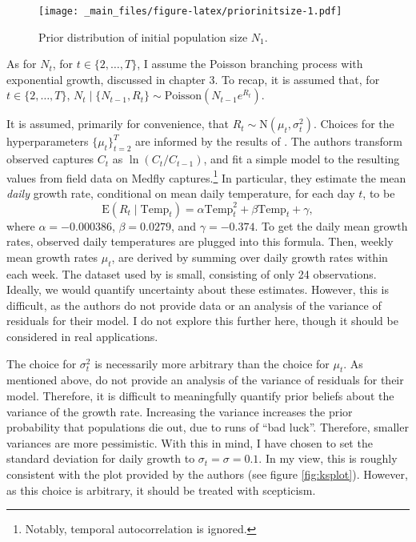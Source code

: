\documentclass[
  oneside]{book}
\begin{document}
\begin{figure}
\centering
\texttt{[image: \_main\_files/figure-latex/priorinitsize-1.pdf]}
\caption{\label{fig:priorinitsize}Prior distribution of initial population size \(N_1\).}
\end{figure}

As for \(N_t\), for \(t \in \{2, \ldots, T\}\), I assume the Poisson branching process with exponential growth, discussed in chapter 3. To recap, it is assumed that, for \(t \in \{2, \ldots, T\}\), \(N_t \mid \{ N_{t-1}, R_t \} \sim \mathrm{Poisson}(N_{t-1} e^{R_t})\).

It is assumed, primarily for convenience, that \(R_t \sim \mathrm N(\mu_t, \sigma^2_t)\). Choices for the hyperparameters \(\{\mu_t\}_{t=2}^T\) are informed by the results of \citet{ks2019}. The authors transform observed captures \(C_t\) as \(\ln (C_t / C_{t-1})\), and fit a simple model to the resulting values from field data on Medfly captures.\footnote{Notably, temporal autocorrelation is ignored.} In particular, they estimate the mean \emph{daily} growth rate, conditional on mean daily temperature, for each day \(t\), to be
\[
\mathrm E(R_t \mid \mathrm{Temp}_t) = \alpha \mathrm{Temp}_t^2 + \beta \mathrm{Temp}_t + \gamma,
\]
where \(\alpha = -0.000386\), \(\beta = 0.0279\), and \(\gamma = -0.374\). To get the daily mean growth rates, observed daily temperatures are plugged into this formula. Then, weekly mean growth rates \(\mu_t\), are derived by summing over daily growth rates within each week. The dataset used by \citet{ks2019} is small, consisting of only 24 observations. Ideally, we would quantify uncertainty about these estimates. However, this is difficult, as the authors do not provide data or an analysis of the variance of residuals for their model. I do not explore this further here, though it should be considered in real applications.

The choice for \(\sigma^2_t\) is necessarily more arbitrary than the choice for \(\mu_t\). As mentioned above, \citet{ks2019} do not provide an analysis of the variance of residuals for their model. Therefore, it is difficult to meaningfully quantify prior beliefs about the variance of the growth rate. Increasing the variance increases the prior probability that populations die out, due to runs of ``bad luck''. Therefore, smaller variances are more pessimistic. With this in mind, I have chosen to set the standard deviation for daily growth to \(\sigma_t = \sigma = 0.1\). In my view, this is roughly consistent with the plot provided by the authors (see figure \ref{fig:ksplot}). However, as this choice is arbitrary, it should be treated with scepticism.
\end{document}
